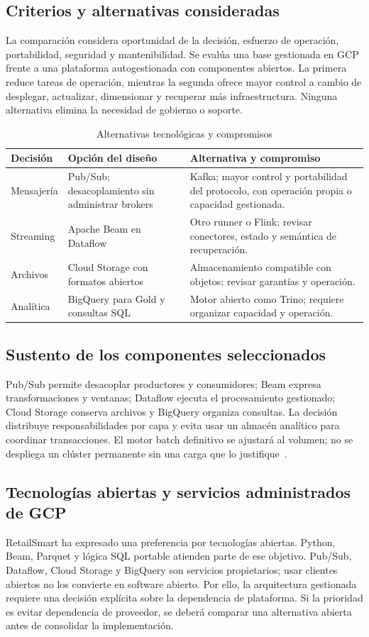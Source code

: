 \documentclass[11pt,a4paper]{article}
\begin{document}
\subsection{Criterios y alternativas consideradas}
La comparación considera oportunidad de la decisión, esfuerzo de operación, portabilidad, seguridad y mantenibilidad. Se evalúa una base gestionada en GCP frente a una plataforma autogestionada con componentes abiertos. La primera reduce tareas de operación, mientras la segunda ofrece mayor control a cambio de desplegar, actualizar, dimensionar y recuperar más infraestructura. Ninguna alternativa elimina la necesidad de gobierno o soporte.
\begin{table}[H]
\caption{Alternativas tecnológicas y compromisos}\label{tab:alternativas}
\small\begin{tabularx}{\linewidth}{@{}P{.21\linewidth}YY@{}}\toprule
Decisión & Opción del diseño & Alternativa y compromiso\\\midrule
Mensajería & Pub/Sub; desacoplamiento sin administrar brokers & Kafka; mayor control y portabilidad del protocolo, con operación propia o capacidad gestionada.\\
Streaming & Apache Beam en Dataflow & Otro runner o Flink; revisar conectores, estado y semántica de recuperación.\\
Archivos & Cloud Storage con formatos abiertos & Almacenamiento compatible con objetos; revisar garantías y operación.\\
Analítica & BigQuery para Gold y consultas SQL & Motor abierto como Trino; requiere organizar capacidad y operación.\\\bottomrule
\end{tabularx}
\end{table}

\subsection{Sustento de los componentes seleccionados}
Pub/Sub permite desacoplar productores y consumidores; Beam expresa transformaciones y ventanas; Dataflow ejecuta el procesamiento gestionado; Cloud Storage conserva archivos y BigQuery organiza consultas. La decisión distribuye responsabilidades por capa y evita usar un almacén analítico para coordinar transacciones. El motor batch definitivo se ajustará al volumen; no se despliega un clúster permanente sin una carga que lo justifique~\cite{pubsub,beam}.

\subsection{Tecnologías abiertas y servicios administrados de GCP}
RetailSmart ha expresado una preferencia por tecnologías abiertas. Python, Beam, Parquet y lógica SQL portable atienden parte de ese objetivo. Pub/Sub, Dataflow, Cloud Storage y BigQuery son servicios propietarios; usar clientes abiertos no los convierte en software abierto. Por ello, la arquitectura gestionada requiere una decisión explícita sobre la dependencia de plataforma. Si la prioridad es evitar dependencia de proveedor, se deberá comparar una alternativa abierta antes de consolidar la implementación.
\end{document}
